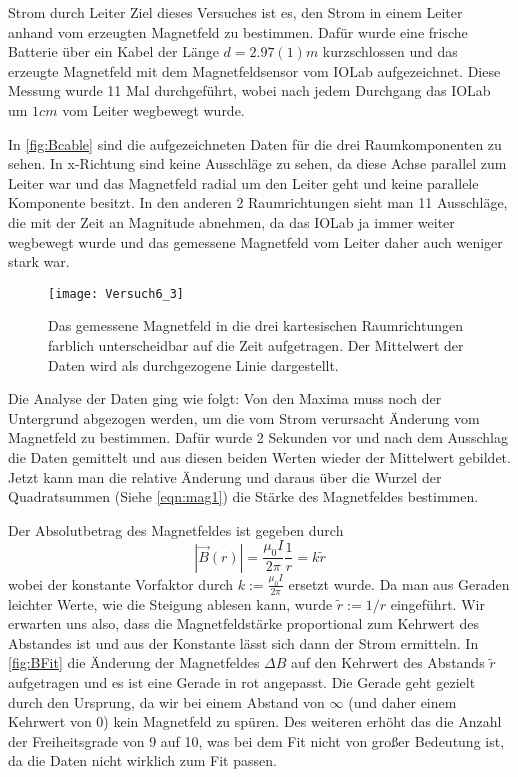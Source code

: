 \documentclass{alex_gp}
\begin{document}
\begin{mybox}{Strom durch Leiter}
	Ziel dieses Versuches ist es, den Strom in einem Leiter anhand vom erzeugten Magnetfeld zu bestimmen. Dafür wurde eine frische Batterie über ein Kabel der Länge \( d = 2.97(1) \unit{m} \) kurzschlossen und das erzeugte Magnetfeld mit dem Magnetfeldsensor vom IOLab aufgezeichnet. Diese Messung wurde 11 Mal durchgeführt, wobei nach jedem Durchgang das IOLab um \( 1 \unit{cm} \) vom Leiter wegbewegt wurde. 
	
	In \autoref{fig:Bcable} sind die aufgezeichneten Daten für die drei Raumkomponenten zu sehen. In x-Richtung sind keine Ausschläge zu sehen, da diese Achse parallel zum Leiter war und das Magnetfeld radial um den Leiter geht und keine parallele Komponente besitzt. In den anderen 2 Raumrichtungen sieht man 11 Ausschläge, die mit der Zeit an Magnitude abnehmen, da das IOLab ja immer weiter wegbewegt wurde und das gemessene Magnetfeld vom Leiter daher auch weniger stark war.
	
	\begin{figure}[H]	
		\centering
		\texttt{[image: Versuch6\_3]}
		\caption{Das gemessene Magnetfeld in die drei kartesischen Raumrichtungen farblich unterscheidbar auf die Zeit aufgetragen. Der Mittelwert der Daten wird als durchgezogene Linie dargestellt.}
		\label{fig:Bcable}
	\end{figure}
	
	Die Analyse der Daten ging wie folgt: 
	Von den Maxima muss noch der Untergrund abgezogen werden, um die vom Strom verursacht Änderung vom Magnetfeld zu bestimmen. Dafür wurde 2 Sekunden vor und nach dem Ausschlag die Daten gemittelt und aus diesen beiden Werten wieder der Mittelwert gebildet. Jetzt kann man die relative Änderung und daraus über die Wurzel der Quadratsummen (Siehe \autoref{eqn:mag1}) die Stärke des Magnetfeldes bestimmen. 
	
	Der Absolutbetrag des Magnetfeldes ist gegeben durch 
	\begin{equation}\label{eqn:last}
		|\vec{B}(r)| = \frac{\mu_0 I}{2\pi}\frac{1}{r} = k\tilde{r}
	\end{equation}
	wobei der konstante Vorfaktor durch \( k := \tfrac{\mu_0 I}{2\pi} \) ersetzt wurde. Da man aus Geraden leichter Werte, wie die Steigung ablesen kann, wurde \( \tilde{r} := 1/r \) eingeführt. Wir erwarten uns also, dass die Magnetfeldstärke proportional zum Kehrwert des Abstandes ist und aus der Konstante lässt sich dann der Strom ermitteln. In \autoref{fig:BFit} die Änderung der Magnetfeldes \( \Delta B \) auf den Kehrwert des Abstands \( \tilde{r} \) aufgetragen und es ist eine Gerade in rot angepasst. Die Gerade geht gezielt durch den Ursprung, da wir bei einem Abstand von \( \infty \) (und daher einem Kehrwert von 0) kein Magnetfeld zu spüren. Des weiteren erhöht das die Anzahl der Freiheitsgrade von 9 auf 10, was bei dem Fit nicht von großer Bedeutung ist, da die Daten nicht wirklich zum Fit passen. 
	

\end{mybox}
\end{document}
